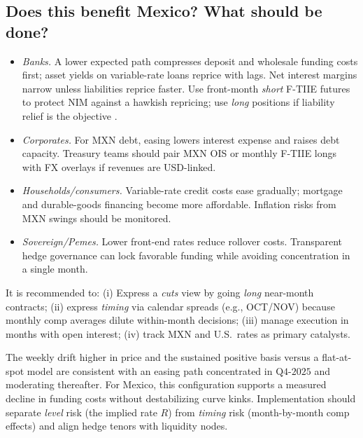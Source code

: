 \documentclass[11pt,a4paper]{article} %
\begin{document}
\subsection{Does this benefit Mexico? What should be done?}

\begin{itemize}

\item \textit{Banks.} A lower expected path compresses deposit and wholesale funding costs first; asset yields on variable-rate loans reprice with lags. Net interest margins narrow unless liabilities reprice faster. Use front-month \textit{short} F-TIIE futures to protect NIM against a hawkish repricing; use \textit{long} positions if liability relief is the objective \citep{cme_ftiie_article}.

\item \textit{Corporates.} For MXN debt, easing lowers interest expense and raises debt capacity. Treasury teams should pair MXN OIS or monthly F-TIIE longs with FX overlays if revenues are USD-linked.

\item \textit{Households/consumers.} Variable-rate credit costs ease gradually; mortgage and durable-goods financing become more affordable. Inflation risks from MXN swings should be monitored.

\item \textit{Sovereign/Pemes.} Lower front-end rates reduce rollover costs. Transparent hedge governance can lock favorable funding while avoiding concentration in a single month.
\end{itemize}

It is recommended to:
(i) Express a \emph{cuts} view by going \textit{long} near-month contracts; 
(ii) express \emph{timing} via calendar spreads (e.g., OCT/NOV) because monthly comp averages dilute within-month decisions; 
(iii) manage execution in months with open interest; 
(iv) track MXN and U.S.\ rates as primary catalysts.

\medskip
The weekly drift higher in price and the sustained positive basis versus a flat-at-spot model are consistent with an easing path concentrated in \(\text{Q4-2025}\) and moderating thereafter. For Mexico, this configuration supports a measured decline in funding costs without destabilizing curve kinks. Implementation should separate \emph{level} risk (the implied rate \(R\)) from \emph{timing} risk (month-by-month comp effects) and align hedge tenors with liquidity nodes.
\end{document}
